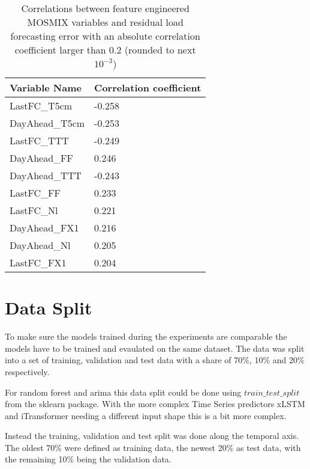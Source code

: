\documentclass[class=scrbook, crop=false]{standalone}
\begin{document}
    
    \begin{table}
    \centering
    \begin{tabular}{l|l}
    Variable Name	& Correlation coefficient \\\hline
	LastFC\_T5cm                        &-0.258\\
	DayAhead\_T5cm                      &-0.253\\
	LastFC\_TTT                         &-0.249\\
	DayAhead\_FF                         &0.246\\
	DayAhead\_TTT                       &-0.243\\
	LastFC\_FF                           &0.233\\
	LastFC\_Nl                           &0.221\\
	DayAhead\_FX1                        &0.216\\
	DayAhead\_Nl                         &0.205\\
	LastFC\_FX1                          &0.204\\
    \end{tabular}
    
    \caption{Correlations between feature engineered MOSMIX variables and residual load forecasting error with an absolute correlation coefficient larger than $0.2$ (rounded to next $10^{-3}$)}
    \label{Table::residual_load_fce_MOSMIX_correlations}
    \end{table}


\section{Data Split}
\label{Section::Data_Split}

To make sure the models trained during the experiments are comparable the models have to be trained and evaulated on the same dataset.
The data was split into a set of training, validation and test data with a share of 70\%, 10\% and 20\% respectively.

For random forest and arima this data split could be done using $train\_test\_split$ from the sklearn package. 
With the more complex Time Series predictors xLSTM and iTransformer needing a different input shape this is a bit more complex.

Instead the training, validation and test split was done along the temporal axis. 
The oldest 70\% were defined as training data, the newest 20\% as test data, with the remaining 10\% being the validation data.
\end{document}
